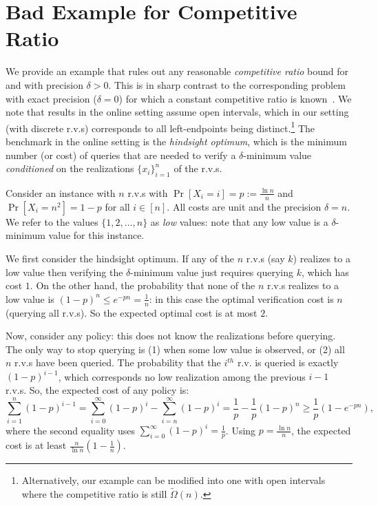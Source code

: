 \documentclass[11pt]{article}
\theoremstyle{remark}
\theoremstyle{plain}
\theoremstyle{remark}
\begin{document}
\section{Bad Example for Competitive Ratio}\label{app:bad-cr}
We provide an example that rules out any reasonable {\em competitive ratio} bound for \smq and \smqi with precision $\delta>0$. This is in sharp contrast to the corresponding problem with exact precision ($\delta=0$)  for which a constant competitive ratio is known~\cite{kahan1991model}.  We note that results in the online setting assume open intervals, which in our setting (with discrete r.v.s)  corresponds to all left-endpoints being distinct.\footnote{Alternatively, our example can be modified into one with open intervals where the competitive ratio is still $\tilde\Omega(n)$.}  The benchmark in the online setting is the {\em hindsight optimum}, which is the minimum number (or cost) of queries that are needed to verify a $\delta$-minimum value  {\em conditioned} on the realizations $\{x_i\}_{i=1}^n$ of the r.v.s.  

Consider an instance with $n$ r.v.s with $\Pr[X_i=i]=p:=\frac{\ln n}n$ and $\Pr[X_i=n^2] = 1-p$ for all $i\in [n]$. All costs are unit and the precision $\delta=n$. We refer to the values $\{1,2,\dots, n\}$ as {\em low} values: note that any low value is a $\delta$-minimum value for this instance.  

We first consider the hindsight optimum. If any of the $n$
 r.v.s (say $k$) realizes to  a low value then verifying the $\delta$-minimum value just requires querying $k$, which has cost $1$. On the other hand, the probability that none of the  $n$ r.v.s   realizes to  a low value is $\left(1-p\right)^n\le e^{-pn}=\frac1n$: in this case the optimal verification cost is $n$ (querying all r.v.s). So the expected optimal cost is at most $2$.  

Now, consider any \smq policy: this does not know the realizations before querying. The only way to stop querying is (1) when some low value is observed, or (2) all $n$ r.v.s have been queried. 
The probability that the $i^{th}$ r.v. is queried is exactly $(1-p)^{i-1}$, which corresponds  no low realization among the previous $i-1$ r.v.s. So, the expected cost of any policy is:
$$\sum_{i=1}^n (1-p)^{i-1} = \sum_{i=0}^\infty (1-p)^i - \sum_{i=n}^\infty (1-p)^i = \frac1p -  \frac1p  (1-p)^n \ge \frac1p (1-e^{-pn}),$$
where the second equality  uses $\sum_{i=0}^\infty (1-p)^i=\frac1p$. Using $p=\frac{\ln n}{n}$, the expected cost is at least $\frac{n}{\ln n}(1-\frac1n)$. 
\end{document}
